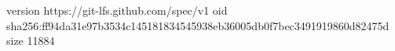 version https://git-lfs.github.com/spec/v1
oid sha256:ff94da31e97b3534c145181834545938eb36005db0f7bec3491919860d82475d
size 11884
